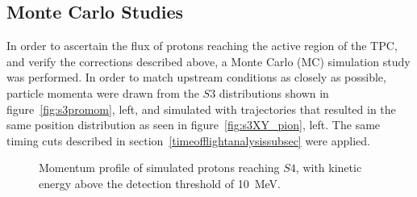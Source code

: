\subsection{Monte Carlo Studies}
In order to ascertain the flux of protons reaching the active region of the TPC, and verify the corrections described above, a Monte Carlo (MC) simulation study was performed. 
In order to match upstream conditions as closely as possible, particle momenta were drawn from the $\mathit{S3}$ distributions shown in figure~\ref{fig:s3promom}, left, and simulated with trajectories that resulted in the same position distribution as seen in figure~\ref{fig:s3XY_pion}, left.
The same timing cuts described in section~\ref{timeofflightanalysissubsec} were applied.

%      

\begin{figure}[ht]
  \centering
     \begin{adjustbox}{max totalsize={\textwidth}{.35\textheight}, center}
      
    \end{adjustbox}
    \caption{Momentum profile of simulated protons reaching $\mathit{S4}$, with kinetic energy above the detection threshold of 10~MeV.}
    \label{fig:MCS4}
\end{figure}

